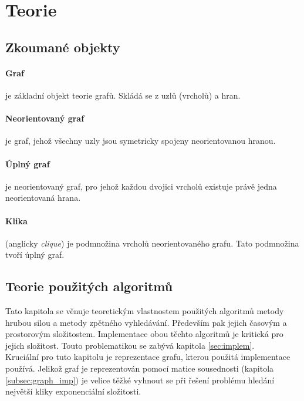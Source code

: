 \documentclass[a4paper]{article}
\begin{document}
\section{Teorie} \label{sec:teorie}
    \subsection{Zkoumané objekty}
        \paragraph{Graf} je základní objekt teorie grafů. Skládá se z uzlů (vrcholů) a hran.\cite{slu_zaklad-teo-grafu}
        
        \paragraph{Neorientovaný graf}
        je graf, jehož všechny uzly jsou symetricky spojeny neorientovanou hranou.\cite{slu_zaklad-teo-grafu}
        
        \paragraph{Úplný graf} je neorientovaný graf, pro jehož každou dvojici vrcholů existuje právě jedna neorientovaná hrana.\cite{slu_zaklad-teo-grafu}
        
        \paragraph{Klika} (anglicky \textit{clique}) je podmnožina vrcholů neorientovaného grafu. Tato podmnožina tvoří úplný graf.\cite{cliq-definition}

    \subsection{Teorie použitých algoritmů} \label{subsec:complexities_teo}
        Tato kapitola se věnuje teoretickým vlastnostem použitých algoritmů metody hrubou silou a metody zpětného vyhledávání. Především pak jejich časovým a prostorovým složitostem. Implementace obou těchto algoritmů je kritická pro jejich složitost. Touto problematikou se zabývá kapitola \ref{sec:implem}.\\

        \noindent
        Kruciální pro tuto kapitolu je reprezentace grafu, kterou použitá implementace používá. Jelikož graf je reprezentován pomocí matice sousednosti (kapitola \ref{subsec:graph_imp}) je velice těžké vyhnout se při řešení problému hledání největší kliky exponenciální složitosti.
\end{document}
